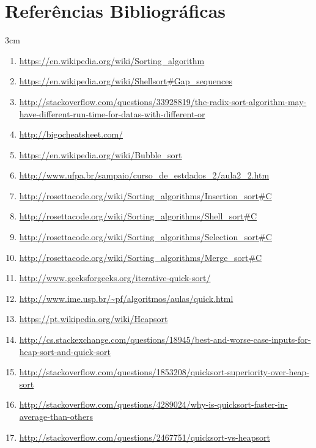 \documentclass[fleqn,10pt]{SelfArx} %
\begin{document}

\section{Referências Bibliográficas}
\begin{adjustwidth}{}{3cm}
\begin{enumerate}
\item \url{https://en.wikipedia.org/wiki/Sorting_algorithm}\label{SortAlgoWiki}
\item \url{https://en.wikipedia.org/wiki/Shellsort#Gap_sequences}\label{ShellWiki}
\item \url{http://stackoverflow.com/questions/33928819/the-radix-sort-algorithm-may-have-different-run-time-for-datas-with-different-or}\label{Question}
\item \url{http://bigocheatsheet.com/} 
\item \url{https://en.wikipedia.org/wiki/Bubble_sort} 
\item \url{http://www.ufpa.br/sampaio/curso_de_estdados_2/aula2_2.htm} 
\item \url{http://rosettacode.org/wiki/Sorting_algorithms/Insertion_sort#C} 
\item \url{http://rosettacode.org/wiki/Sorting_algorithms/Shell_sort#C} 
\item \url{http://rosettacode.org/wiki/Sorting_algorithms/Selection_sort#C} 
\item \url{http://rosettacode.org/wiki/Sorting_algorithms/Merge_sort#C} 
\item \url{http://www.geeksforgeeks.org/iterative-quick-sort/} 
\item \url{http://www.ime.usp.br/~pf/algoritmos/aulas/quick.html} 
\item \url{https://pt.wikipedia.org/wiki/Heapsort} 
\item \url{http://cs.stackexchange.com/questions/18945/best-and-worse-case-inputs-for-heap-sort-and-quick-sort}\label{Heap}
\item \url{http://stackoverflow.com/questions/1853208/quicksort-superiority-over-heap-sort}\label{qsortBest1}
\item \url{http://stackoverflow.com/questions/4289024/why-is-quicksort-faster-in-average-than-others}\label{qsortBest2}
\item \url{http://stackoverflow.com/questions/2467751/quicksort-vs-heapsort}\label{qvsh}

\end{enumerate}
\end{adjustwidth}
\end{document}
